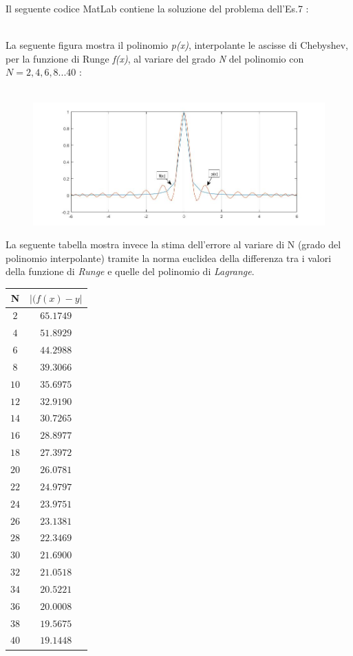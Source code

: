 Il seguente codice MatLab contiene la soluzione del problema dell'Es.7 :\\\
	
La seguente figura mostra il polinomio \textit{p(x)}, interpolante le ascisse di Chebyshev, per la funzione di Runge \textit{f(x)}, al variare del grado \textit{N} del polinomio con $N=2,4,6,8...40$ :\\\
	\begin{figure}[H]
  		\label{Cap_4_Es_7}
  		\includegraphics[width=\textwidth]{Plot/Cap_4_Es_7}
	\end{figure}
La seguente tabella mostra invece la stima dell'errore al variare di N (grado del polinomio interpolante) tramite la norma euclidea 
della differenza tra i valori della funzione di \textit{Runge} e quelle del polinomio di \textit{Lagrange}.
	\begin{center}
		\begin{tabular}{|c|c|}
			\hline
				N & $|(f(x)-y|$ \\
    			\hline
    				$2$  & $65.1749$ \\
    				$4$  & $51.8929$ \\
    				$6$  & $44.2988$ \\
    				$8$  & $39.3066$ \\
    				$10$ & $35.6975$ \\
    				$12$ & $32.9190$ \\
    				$14$ & $30.7265$ \\
    				$16$ & $28.8977$ \\
    				$18$ & $27.3972$ \\
    				$20$ & $26.0781$ \\
    				$22$ & $24.9797$ \\
   					$24$ & $23.9751$ \\
    				$26$ & $23.1381$ \\
    				$28$ & $22.3469$ \\
    				$30$ & $21.6900$ \\
    				$32$ & $21.0518$ \\
    				$34$ & $20.5221$ \\
    				$36$ & $20.0008$ \\
    				$38$ & $19.5675$ \\
    				$40$ & $19.1448$ \\
				\hline
		\end{tabular}
	\end{center} 